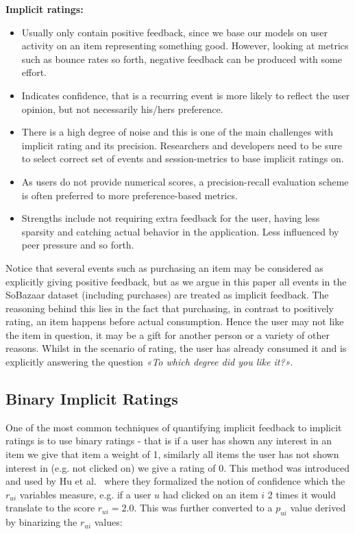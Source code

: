 \textbf{Implicit ratings:}
\begin{itemize}
\item Usually only contain positive feedback, since we base our models on user
activity on an item representing something good. However, looking at metrics
such as bounce rates so forth, negative feedback can be produced with some
effort.
\item Indicates confidence, that is a recurring event is more likely to reflect
the user opinion, but not necessarily his/hers preference.
\item There is a high degree of noise and this is one of the main challenges
with implicit rating and its precision. Researchers and developers need to be
sure to select correct set of events and session-metrics to base implicit
ratings on.
\item As users do not provide numerical scores, a precision-recall evaluation
scheme is often preferred to more preference-based metrics.
\item Strengths include not requiring extra feedback for the user, having less
sparsity and catching actual behavior in the application. Less influenced by
peer pressure and so forth.
\end{itemize}

Notice that several events such as purchasing an item may be considered as
explicitly giving positive feedback, but as we argue in this paper all events
in the SoBazaar dataset (including purchases) are treated as implicit feedback.
The reasoning behind this lies in the fact that purchasing, in contrast to
positively rating, an item happens before actual consumption. Hence the user may
not like the item in question, it may be a gift for another person or a variety
of other reasons. Whilst in the scenario of rating, the user has already
consumed it and is explicitly answering the question \textit{«To which degree
did you like it?»}.

\clearpage
\subsection{Binary Implicit Ratings}
\label{implicit-als-wr}

One of the most common techniques of quantifying implicit feedback to implicit
ratings is to use binary ratings - that is if a user has shown any interest in
an item we give that item a weight of 1, similarly all items the user has not
shown interest in (e.g. not clicked on) we give a rating of 0. This method was
introduced and used by Hu et al.~\cite{Hu2008} where they formalized the
notion of confidence which the $r_{ui}$ variables measure, e.g. if a user $u$
had clicked on an item $i$ 2 times it would translate to the score $r_{ui} =
2.0$. This was further converted to a $p_{ui}$ value derived by binarizing the
$r_{ui}$ values:

